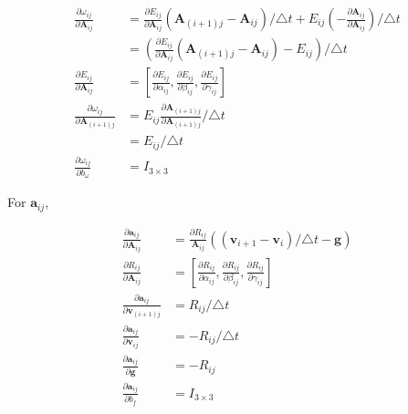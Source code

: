 \documentclass[12pt]{article}   %
\begin{document}
\begin{align}
	\frac{\partial \omega_{ij}}{\partial \textbf{A}_{ij}} &= \frac{\partial E_{ij}}{\partial \textbf{A}_{ij}} (\textbf{A}_{(i+1)j} - \textbf{A}_{ij})/\triangle t + E_{ij} (- \frac{\partial \textbf{A}_{ij}}{\partial \textbf{A}_{ij}})/\triangle t \nonumber \\
		&= (\frac{\partial E_{ij}}{\partial \textbf{A}_{ij}} (\textbf{A}_{(i+1)j} - \textbf{A}_{ij}) - E_{ij})/\triangle t \\
	\frac{\partial E_{ij}}{\partial \textbf{A}_{ij}} &= [\frac{\partial E_{ij}}{\partial \alpha_{ij}}, \frac{\partial E_{ij}}{\partial \beta_{ij}}, \frac{\partial E_{ij}}{\partial \gamma_{ij}}] \\
	\frac{\partial \omega_{ij}}{\partial \textbf{A}_{(i+1)j}} &= E_{ij} \frac{\partial \textbf{A}_{(i+1)j}}{\partial \textbf{A}_{(i+1)j}}/\triangle t \\
		&= E_{ij}/\triangle t \\
	\frac{\partial \omega_{ij}}{\partial b_{\omega}} &= I_{3\times 3} 
\end{align}

For $\textbf{a}_{ij}$,

\begin{align}
\frac{\partial \textbf{a}_{ij}}{\partial \textbf{A}_{ij}} &= \frac{\partial R_{ij}} {\textbf{A}_{ij}} ((\textbf{v}_{i+1} - \textbf{v}_i) / \triangle t - \textbf{g}) \\
\frac{\partial R_{ij}}{\partial \textbf{A}_{ij}} &= [\frac{\partial R_{ij}}{\partial \alpha_{ij}}, \frac{\partial R_{ij}}{\partial \beta_{ij}}, \frac{\partial R_{ij}}{\partial \gamma_{ij}}] \\
\frac{\partial \textbf{a}_{ij}}{\partial \textbf{v}_{(i+1)j}} &= R_{ij} / \triangle t \\
\frac{\partial \textbf{a}_{ij}}{\partial \textbf{v}_{ij}} &= - R_{ij} / \triangle t \\
\frac{\partial \textbf{a}_{ij}}{\partial \textbf{g}} &= - R_{ij}\\
\frac{\partial \textbf{a}_{ij}}{\partial b_{f}} &= I_{3\times 3} 
\end{align}
\end{document}

